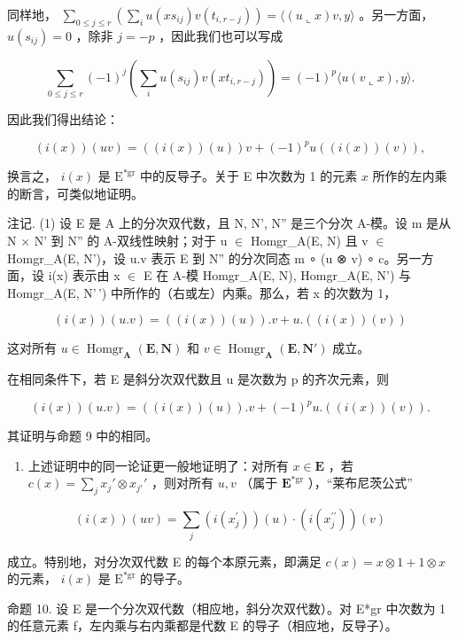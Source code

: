 同样地， \(\sum_{0\leqslant j\leqslant r}\left(\sum_{i}u(xs_{ij})v(t_{i,r - j})\right) = \langle (u\llcorner x)v,y\rangle\) 。另一方面， \(u(s_{ij}) = 0\) ，除非 \(j = -p\) ，因此我们也可以写成

\[
\sum_ {0 \leqslant j \leqslant r} (- 1) ^ {j} \left(\sum_ {i} u (s _ {i j}) v (x t _ {i, r - j})\right) = (- 1) ^ {p} \langle u (v \llcorner x), y \rangle .
\]

因此我们得出结论：

\[
(i (x)) (u v) = ((i (x)) (u)) v + (- 1) ^ {p} u ((i (x)) (v)),\tag{65}
\]

换言之， \(i(x)\) 是 \(\mathrm{E}^{*\mathrm{gr}}\) 中的反导子。关于 E 中次数为 1 的元素 \(x\) 所作的左内乘的断言，可类似地证明。

注记. (1) 设 E 是 A 上的分次双代数，且 N, N', N'' 是三个分次 A-模。设 m 是从 N × N' 到 N'' 的 A-双线性映射；对于 u \ensuremath{\in} Homgr\_A(E, N) 且 v \ensuremath{\in} Homgr\_A(E, N')，设 u.v 表示 E 到 N'' 的分次同态 m ∘ (u ⊗ v) ∘ c。另一方面，设 i(x) 表示由 x \ensuremath{\in} E 在 A-模 Homgr\_A(E, N), Homgr\_A(E, N') 与 Homgr\_A(E, N'\,') 中所作的（右或左）内乘。那么，若 x 的次数为 1，

\[
(i (x)) (u. v) = ((i (x)) (u)). v + u. ((i (x)) (v))
\]

这对所有 \(u \in \operatorname{Homgr}_{\mathbf{A}}(\mathbf{E}, \mathbf{N})\) 和 \(v \in \operatorname{Homgr}_{\mathbf{A}}(\mathbf{E}, \mathbf{N}')\) 成立。

在相同条件下，若 E 是斜分次双代数且 u 是次数为 p 的齐次元素，则

\[
(i (x)) (u. v) = ((i (x)) (u)). v + (- 1) ^ {p} u. ((i (x)) (v)).
\]

其证明与命题 9 中的相同。

\begin{enumerate}
\def\labelenumi{(\arabic{enumi})}
\setcounter{enumi}{1}
\tightlist
\item
  上述证明中的同一论证更一般地证明了：对所有 \(x \in \mathbf{E}\) ，若 \(c(x) = \sum_{j} x_j' \otimes x_{j'}'\) ，则对所有 \(u, v\) （属于 \(\mathbf{E}^{*\mathrm{gr}}\) ），“莱布尼茨公式”
\end{enumerate}

\[
(i (x)) (u v) = \sum_ {j} (i (x _ {j} ^ {\prime})) (u) \cdot (i (x _ {j} ^ {\prime \prime})) (v)
\]

成立。特别地，对分次双代数 E 的每个本原元素，即满足 \(c(x) = x \otimes 1 + 1 \otimes x\) 的元素， \(i(x)\) 是 \(\mathrm{E}^{*\mathrm{gr}}\) 的导子。

命题 10. 设 E 是一个分次双代数（相应地，斜分次双代数）。对 E*gr 中次数为 1 的任意元素 f，左内乘与右内乘都是代数 E 的导子（相应地，反导子）。

